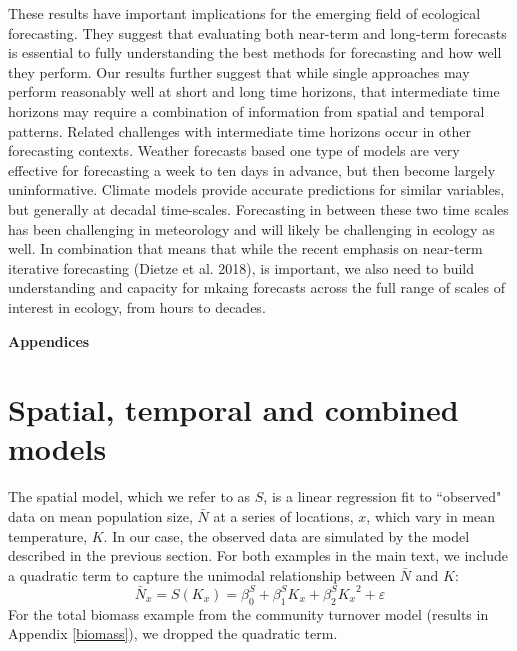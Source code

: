 \documentclass[11pt]{article}
\begin{document}
These results have important implications for the emerging field of ecological forecasting. They suggest that evaluating both near-term and long-term
forecasts is essential to fully understanding the best methods for forecasting and how well they perform. Our results further suggest that while
single approaches may perform reasonably well at short and long time horizons, that intermediate time horizons may require a combination of information
from spatial and temporal patterns. Related challenges with intermediate time horizons occur in other forecasting contexts. Weather forecasts based one
type of models are very effective for forecasting a week to ten days in advance, but then become largely uninformative. Climate models provide accurate
predictions for similar variables, but generally at decadal time-scales. Forecasting in between these two time scales has been challenging in meteorology
and will likely be challenging in ecology as well. In combination that means that while the recent emphasis on near-term iterative forecasting (Dietze 
et al. 2018), is important, we also need to build understanding and capacity for mkaing forecasts across the full range of scales of interest in
ecology, from hours to decades. 

\newpage
\renewcommand{\refname}{Literature cited}





\clearpage 
\newpage 

\setcounter{page}{1}
\setcounter{equation}{0}
\setcounter{figure}{0}
\setcounter{section}{0}
\setcounter{table}{0}

\centerline{\Large \textbf{Appendices}}

\renewcommand{\thesection}{\Alph{section}}

\section{Spatial, temporal and combined models}\label{models}

The spatial model, which we refer to as $S$, is a linear regression fit to ``observed" data on mean population size, $\bar{N}$ at a series of locations, $x$, which vary in mean temperature, $K$. In our case, the observed data are simulated by the model described in the previous section. For both examples in the main text, we include a quadratic term to capture the unimodal relationship between  $\bar{N}$ and $K$:
 \begin{equation}
 \bar{N}_x = S(K_x) = \beta^S_0 +  \beta^S_1 K_x +\beta^S_2 {K_x}^2 + \varepsilon
 \label{eqn:spatial_regression}
 \end{equation}
For the total biomass example from the community turnover model (results in Appendix \ref{biomass}), we dropped the quadratic term.
\end{document}

